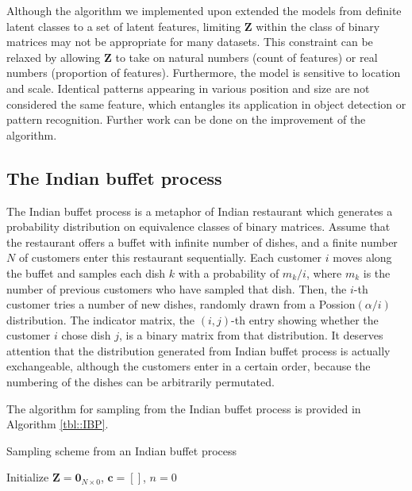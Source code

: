 \documentclass{article}
\begin{document}
Although the algorithm we implemented upon extended the models from definite latent classes to a set of latent features, limiting $\mathbf{Z}$ within the class of binary matrices may not be appropriate for many datasets. This constraint can be relaxed by allowing $\mathbf{Z}$ to take on natural numbers (count of features) or real numbers (proportion of features). Furthermore, the model is sensitive to location and scale. Identical patterns appearing in various position and size are not considered the same feature, which entangles its application in object detection or pattern recognition. Further work can be done on the improvement of the algorithm.




\newpage
\begin{appendices}
  \section{The Indian buffet process}\label{sec::IBP}
  The Indian buffet process is a metaphor of Indian restaurant which generates a probability distribution on equivalence classes of binary matrices. Assume that the restaurant offers a buffet with infinite number of dishes, and a finite number $N$ of customers enter this restaurant sequentially. Each customer $i$ moves along the buffet and samples each dish $k$ with a probability of $m_k/i$, where $m_k$ is the number of previous customers who have sampled that dish. Then, the $i$-th customer tries a number of new dishes, randomly drawn from a Possion$(\alpha / i)$ distribution. The indicator matrix, the $(i,j)$-th entry showing whether the customer $i$ chose dish $j$, is a binary matrix from that distribution. It deserves attention that the distribution generated from Indian buffet process is actually exchangeable, although the customers enter in a certain order, because the numbering of the dishes can be arbitrarily permutated.

  The algorithm for sampling from the Indian buffet process is provided in Algorithm \ref{tbl::IBP}.
 
  \begin{algorithm}
    \caption{Sampling scheme from an Indian buffet process}
    \label{tbl::IBP}
    Initialize $\mathbf{Z} = \mathbf{0}_{N\times 0}$, $\boldsymbol{c} = []$, $n = 0$\;
\end{algorithm}
\end{appendices}
\end{document}
